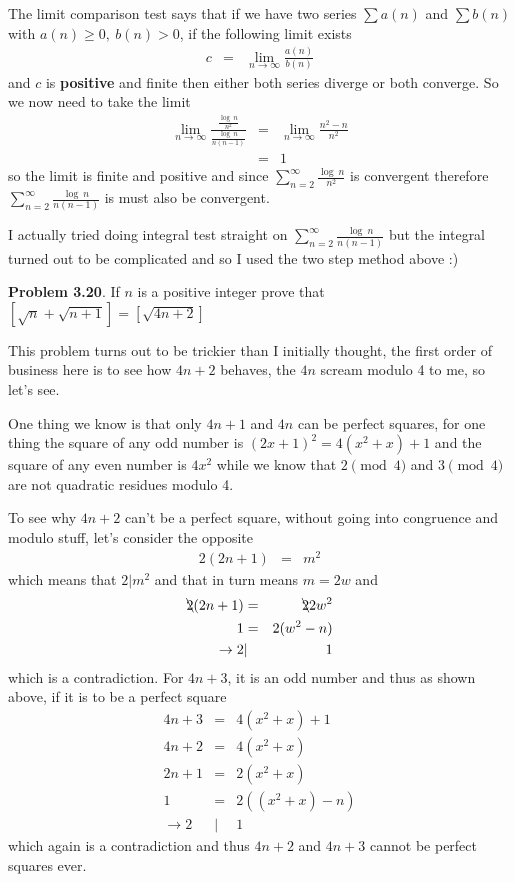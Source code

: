 \documentclass[aps,preprint,preprintnumbers,nofootinbib,showpacs,prd]{revtex4-1}
\newcommand{\nbea}{\begin{eqnarray*}}
\newcommand{\neea}{\end{eqnarray*}}
\begin{document}
The limit comparison test says that if we have two series $\sum a(n)$ and $\sum b(n)$ with $a(n)\ge0,~b(n) > 0$, if the following limit exists
%
\nbea
c & = & \lim_{n\to\infty} \frac{a(n)}{b(n)}
\neea
%
and $c$ is {\bf positive} and finite then either both series diverge or both converge. So we now need to take the limit
%
\nbea
\lim_{n\to\infty}\frac{\frac{\log~n}{n^2}}{\frac{\log~n}{n(n-1)}} & = & \lim_{n\to\infty} \frac{n^2 - n}{n^2} \\
& = & 1
\neea
%
so the limit is finite and positive and since $\sum_{n=2}^{\infty} \frac{\log~n}{n^2}$ is convergent therefore $\sum_{n=2}^{\infty} \frac{\log~n}{n(n-1)}$ is must also be convergent.

I actually tried doing integral test straight on $\sum_{n=2}^{\infty} \frac{\log~n}{n(n-1)}$ but the integral turned out to be complicated and so I used the two step method above :)

{\bf Problem 3.20}. If $n$ is a positive integer prove that $[\sqrt{n} + \sqrt{n+1}] = [\sqrt{4n+2}]$

This problem turns out to be trickier than I initially thought, the first order of business here is to see how $4n+2$ behaves, the $4n$ scream modulo 4 to me, so let's see.

One thing we know is that only $4n+1$ and $4n$ can be perfect squares, for one thing the square of any odd number is $(2x+1)^2 = 4(x^2+x)+1$ and the square of any even number is $4x^2$ while we know that $2 \pmod{4}$ and $3 \pmod{4}$ are not quadratic residues modulo 4.

To see why $4n+2$ can't be a perfect square, without going into congruence and modulo stuff, let's consider the opposite
%
\nbea
2(2n+1) & = & m^2
\neea
%
which means that $2|m^2$ and that in turn means $m = 2w$ and
%
\nbea
\bcancel{2}(2n+1) & = & \bcancel{2}2w^2 \\
1 & = & 2 (w^2 - n) \\
\to 2 &|& 1
\neea
%
which is a contradiction. For $4n+3$, it is an odd number and thus as shown above, if it is to be a perfect square
%
\nbea
4n+3 & = & 4(x^2+x) + 1 \\
4n + 2 & = & 4(x^2+x) \\
2n + 1 & = & 2(x^2 + x) \\
1 & = & 2 ((x^2+x) - n) \\
\to 2 &|& 1
\neea
%
which again is a contradiction and thus $4n+2$ and $4n+3$ cannot be perfect squares ever.
\end{document}
